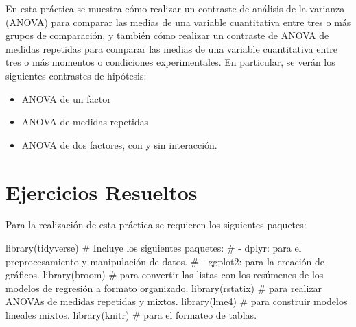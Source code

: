 \documentclass[
  a4paper,
]{scrreport}
\newenvironment{Shaded}{\begin{snugshade}}{\end{snugshade}}
\newcommand{\CommentTok}[1]{\textcolor[rgb]{0.37,0.37,0.37}{#1}}
\newcommand{\FunctionTok}[1]{\textcolor[rgb]{0.28,0.35,0.67}{#1}}
\newcommand{\NormalTok}[1]{\textcolor[rgb]{0.00,0.23,0.31}{#1}}
\providecommand{\tightlist}{%
  \setlength{\itemsep}{0pt}\setlength{\parskip}{0pt}}\usepackage{longtable,booktabs,array}
\theoremstyle{definition}
\theoremstyle{remark}
\begin{document}
En esta práctica se muestra cómo realizar un contraste de análisis de la
varianza (ANOVA) para comparar las medias de una variable cuantitativa
entre tres o más grupos de comparación, y también cómo realizar un
contraste de ANOVA de medidas repetidas para comparar las medias de una
variable cuantitativa entre tres o más momentos o condiciones
experimentales. En particular, se verán los siguientes contrastes de
hipótesis:

\begin{itemize}
\tightlist
\item
  ANOVA de un factor
\item
  ANOVA de medidas repetidas
\item
  ANOVA de dos factores, con y sin interacción.
\end{itemize}

\section{Ejercicios Resueltos}\label{ejercicios-resueltos-7}

Para la realización de esta práctica se requieren los siguientes
paquetes:

\begin{Shaded}
\begin{Highlighting}[]
\FunctionTok{library}\NormalTok{(tidyverse)}
\CommentTok{\# Incluye los siguientes paquetes:}
\CommentTok{\# {-} dplyr: para el preprocesamiento y manipulación de datos.}
\CommentTok{\# {-} ggplot2: para la creación de gráficos.}
\FunctionTok{library}\NormalTok{(broom) }\CommentTok{\# para convertir las listas con los resúmenes de los modelos de regresión a formato organizado.}
\FunctionTok{library}\NormalTok{(rstatix) }\CommentTok{\# para realizar ANOVAs de medidas repetidas y mixtos.}
\FunctionTok{library}\NormalTok{(lme4) }\CommentTok{\# para construir modelos lineales mixtos.}
\FunctionTok{library}\NormalTok{(knitr) }\CommentTok{\# para el formateo de tablas.}
\end{Highlighting}
\end{Shaded}
\end{document}
